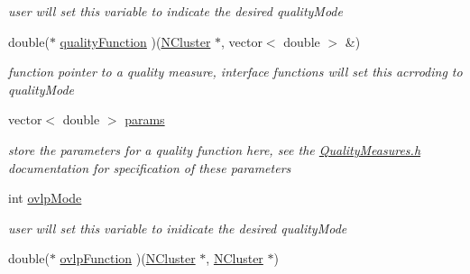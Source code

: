 \begin{DoxyCompactItemize}
\begin{DoxyCompactList}\small\item\em user will set this variable to indicate the desired qualityMode \item\end{DoxyCompactList}\item 
\hypertarget{class_lattice_algos_ae25f31284b5956278f390d0edc412ef8}{
double($\ast$ \hyperlink{class_lattice_algos_ae25f31284b5956278f390d0edc412ef8}{qualityFunction} )(\hyperlink{class_n_cluster}{NCluster} $\ast$, vector$<$ double $>$ \&)}
\label{class_lattice_algos_ae25f31284b5956278f390d0edc412ef8}

\begin{DoxyCompactList}\small\item\em function pointer to a quality measure, interface functions will set this acrroding to qualityMode \item\end{DoxyCompactList}\item 
\hypertarget{class_lattice_algos_a84a7c48411084ff5d792af41e57ce96a}{
vector$<$ double $>$ \hyperlink{class_lattice_algos_a84a7c48411084ff5d792af41e57ce96a}{params}}
\label{class_lattice_algos_a84a7c48411084ff5d792af41e57ce96a}

\begin{DoxyCompactList}\small\item\em store the parameters for a quality function here, see the \hyperlink{_quality_measures_8h_source}{QualityMeasures.h} documentation for specification of these parameters \item\end{DoxyCompactList}\item 
\hypertarget{class_lattice_algos_a7a9a7568a564e929c494c7c94ed5dda5}{
int \hyperlink{class_lattice_algos_a7a9a7568a564e929c494c7c94ed5dda5}{ovlpMode}}
\label{class_lattice_algos_a7a9a7568a564e929c494c7c94ed5dda5}

\begin{DoxyCompactList}\small\item\em user will set this variable to inidicate the desired qualityMode \item\end{DoxyCompactList}\item 
\hypertarget{class_lattice_algos_ad2bd9f8cb22cb27dfe527dd2bc38ec2d}{
double($\ast$ \hyperlink{class_lattice_algos_ad2bd9f8cb22cb27dfe527dd2bc38ec2d}{ovlpFunction} )(\hyperlink{class_n_cluster}{NCluster} $\ast$, \hyperlink{class_n_cluster}{NCluster} $\ast$)}
\label{class_lattice_algos_ad2bd9f8cb22cb27dfe527dd2bc38ec2d}


\end{DoxyCompactItemize}
